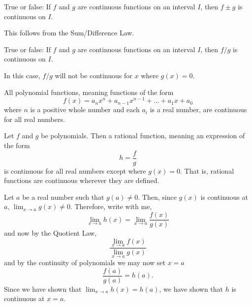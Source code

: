 \documentclass{ximera}
\begin{document}
\begin{question}
  True or false: If $f$ and $g$ are continuous functions on an
  interval $I$, then $f\pm g$ is continuous on $I$.
  \begin{multipleChoice}
  \end{multipleChoice}
  \begin{feedback}
    This follows from the Sum/Difference Law.
  \end{feedback}
\end{question}

\begin{question}
  True or false: If $f$ and $g$ are continuous functions on an
  interval $I$, then $f/g$ is continuous on $I$.
  \begin{multipleChoice}
  \end{multipleChoice}
  \begin{feedback}
    In this case, $f/g$ will not be continuous for $x$ where $g(x) =
    0$.
  \end{feedback}
\end{question}


\begin{theorem}
  All polynomial functions, meaning functions of the form
  \[
  f(x) = a_nx^n + a_{n-1}x^{n-1} + \dots + a_1 x + a_0
  \]
  where $n$ is a positive whole number and each $a_i$ is a real number, are
  continuous for all real numbers.
\end{theorem}

\begin{theorem}
  Let $f$ and $g$ be polynomials.  Then a rational function, meaning an
  expression of the form
  \[
  h=\frac{f}{g}
  \]
  is continuous for all real numbers except where $g(x)=0$.  That is,
  rational functions are continuous wherever they are defined.
\begin{explanation}
      Let $a$ be a real number such that $g(a)\neq 0$.  Then, since
      $g(x)$ is continuous at $a$, $\displaystyle\lim_{x\to a} g(x) \neq 0$.
      Therefore, write with me, 
      \[
      \displaystyle\lim_{x \to a} h(x) = \displaystyle\lim_{x\to a} \frac{f(x)}{g(x)}
      \]
      and now by the Quotient Law, 
      \[
      \frac{\displaystyle\lim_{x\to a} f(x)}{\displaystyle \lim_{x\to a} g(x)}
      \]
      and by the continuity of polynomials we may now set $x=a$
      \[
      \frac{f(a)}{g(a)}=h(a).
      \]
      Since we have shown that $\displaystyle\lim_{x\to a} h(x) = h(a)$, we have
      shown that $h$ is continuous at $x=a$.
\end{explanation}
\end{theorem}
\end{document}
